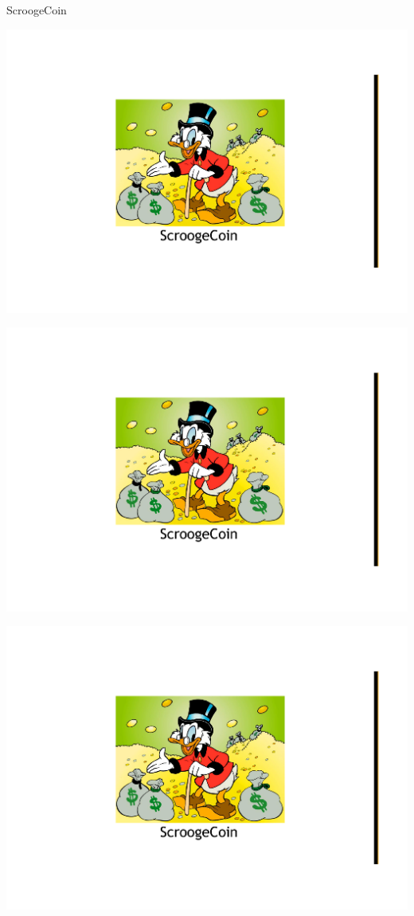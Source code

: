 \begin{frame}{ScroogeCoin}
\begin{overprint}
\begin{center}
\includegraphics[width=\textwidth,page=3]{scrooge-coin}
\end{center}
\begin{center}
\includegraphics[width=\textwidth,page=4]{scrooge-coin}
\end{center}
\begin{center}
\includegraphics[width=\textwidth,page=5]{scrooge-coin}
\end{center}
\end{overprint}


\end{frame}
